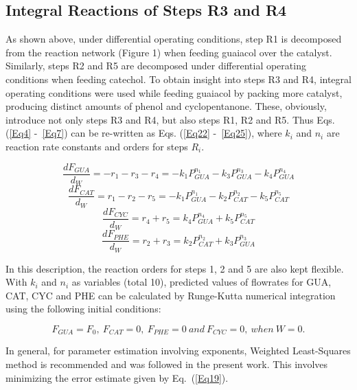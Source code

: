 \documentclass[journal=iecred,manuscript=article]{achemso}
\begin{document}
\subsection{Integral Reactions of Steps R3 and R4}

As shown above, under differential operating conditions,
step R1 is decomposed from the reaction network (Figure 1) when feeding guaiacol over the catalyst.
Similarly, steps R2 and R5 are decomposed under differential operating conditions when feeding catechol.
To obtain insight into steps R3 and R4,
integral operating conditions were used while feeding guaiacol
by packing more catalyst,
producing distinct amounts of phenol and cyclopentanone.
These, obviously, introduce not only steps R3 and R4, but also steps R1, R2 and R5.
Thus Eqs. (\ref{Eq4} -~\ref{Eq7}) can be re-written as Eqs. (\ref{Eq22} -~\ref{Eq25}),
where $k_i$ and $n_i$ are reaction rate constants and orders for steps $R_i$.

\begin{equation} \label{Eq22}
\frac{dF_{GUA}}{d_{W}}=-r_1-r_3-r_4=-k_1 P_{GUA}^{n_1}-k_3 P_{GUA}^{n_3}-k_4 P_{GUA}^{n_4}
\end{equation}
\begin{equation} \label{Eq23}
\frac{dF_{CAT}}{d_{W}}=r_1-r_2-r_5=-k_1 P_{GUA}^{n_1}-k_2 P_{CAT}^{n_2}-k_5 P_{CAT}^{n_5}
\end{equation}
\begin{equation} \label{Eq24}
\frac{dF_{CYC}}{d_{W}}=r_4+r_5=k_4 P_{GUA}^{n_4}+k_5 P_{CAT}^{n_5}
\end{equation}
\begin{equation} \label{Eq25}
\frac{dF_{PHE}}{d_{W}}=r_2+r_3=k_2 P_{CAT}^{n_2}+k_3 P_{GUA}^{n_3}
\end{equation}

In this description, the reaction orders for steps 1, 2 and 5 are also kept flexible. With $k_i$ and $n_i$ as variables (total 10),
predicted values of flowrates for GUA, CAT, CYC and PHE can be calculated
by Runge-Kutta numerical integration using the following initial conditions:

\begin{equation} \label{Eq18}
F_{GUA}=F_0,~F_{CAT}=0,~F_{PHE}=0~and~F_{CYC}=0,~when~W=0.
\end{equation}

In general, for parameter estimation involving exponents,
Weighted Least-Squares method is recommended and was followed in the present work\cite{Norris1981, Fogler2005, Box2005}.   
This involves minimizing the error estimate given by Eq.~(\ref{Eq19}). 
\end{document}
